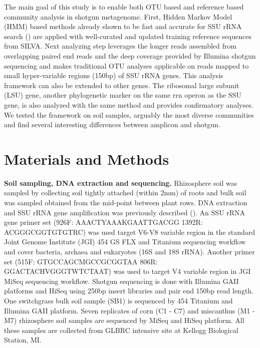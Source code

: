 \documentclass[12pt]{article}
\begin{document}
The main goal of this study is to enable both OTU based and reference
based community analysis in shotgun metagenome. First, Hidden Markov
Model (HMM) based methods already shown to be fast and accurate for
SSU rRNA search (\cite{metarna,rrnaselector,metaxa}) are applied with
well-curated and updated training reference sequences from SILVA. Next
analyzing step leverages the longer reads assembled from overlapping
paired end reads and the deep coverage provided by Illumina shotgun
sequencing and makes traditional OTU analyses applicable on reads
mapped to small hyper-variable regions (150bp) of SSU rRNA genes. This
analysis framework can also be extended to other genes. The ribosomal
large subunit (LSU) gene, another phylogenetic marker on the same rrn
operon as the SSU gene, is also analyzed with the same method and
provides confirmatory analyses. We tested the framework on soil
samples, arguably the most diverse communities and find several
interesting differences between amplicon and shotgun.

\section{Materials and Methods}

{\bf Soil sampling, DNA extraction and sequencing. } Rhizosphere soil
was sampled by collecting soil tightly attached (within 2mm) of roots
and bulk soil was sampled obtained from the mid-point between plant
rows. DNA extraction and SSU rRNA gene amplification was previously
described (\cite{ed2010}). An SSU rRNA gene primer set (926F:
AAACTYAAAKGAATTGACGG 1392R: ACGGGCGGTGTGTRC) was used target V6-V8
variable region in the standard Joint Genome Institute (JGI) 454 GS
FLX and Titanium sequencing workflow and cover bacteria, archaea and
eukaryotes (16S and 18S rRNA). Another primer set (515F:
GTGCCAGCMGCCGCGGTAA 806R: GGACTACHVGGGTWTCTAAT) was used to target V4
variable region in JGI MiSeq sequencing workflow. Shotgun sequencing
is done with Illumina GAII platforms and HiSeq using 250bp insert
libraries and pair end 150bp read length. One switchgrass bulk soil
sample (SB1) is sequenced by 454 Titanium and Illumina GAII
platform. Seven replicates of corn (C1 - C7) and miscanthus (M1 - M7)
rhizosphere soil samples are sequenced by MiSeq and HiSeq
platform. All these samples are collected from GLBRC intensive site at
Kellogg Biological Station, MI.
\end{document}
